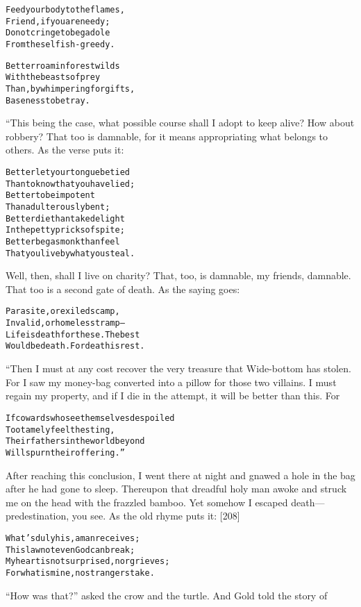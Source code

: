 \documentclass{article}
\renewenvironment{verbatim}{\begin{alltt}\normalfont\begin{centering}}{\end{centering}\end{alltt}}
\begin{document}
\begin{verbatim}
Feed your body to the flames,
    Friend, if you are needy;
Do not cringe to beg a dole
    From the selfish-greedy.

Better roam in forest wilds
With the beasts of prey
Than, by whimpering for gifts,
Baseness to betray.
\end{verbatim}
“This being the case, what possible course shall I adopt to keep
alive? How about robbery? That too is damnable, for it means
appropriating what belongs to others. As the verse puts it:

\begin{verbatim}
Better let your tongue be tied
Than to know that you have lied;
Better to be impotent
Than adulterously bent;
Better die than take delight
In the petty pricks of spite;
Better beg as monk than feel
That you live by what you steal.
\end{verbatim}
Well, then, shall I live on charity? That, too, is damnable, my
friends, damnable. That too is a second gate of death. As the
saying goes:

\begin{verbatim}
Parasite, or exiled scamp,
Invalid, or homeless tramp--
Life is death for these. The best
Would be death. For death is rest.
\end{verbatim}
“Then I must at any cost recover the very treasure that Wide-bottom
has stolen. For I saw my money-bag converted into a pillow for
those two villains. I must regain my property, and if I die in the
attempt, it will be better than this. For

\begin{verbatim}
If cowards who see themselves despoiled
    Too tamely feel the sting,
Their fathers in the world beyond
    Will spurn their offering.”
\end{verbatim}
After reaching this conclusion, I went there at night and gnawed a
hole in the bag after he had gone to sleep. Thereupon that dreadful
holy man awoke and struck me on the head with the frazzled bamboo.
Yet somehow I escaped death---predestination, you see. As the old
rhyme puts it: [208]

\begin{verbatim}
What's duly his, a man receives;
    This law not even God can break;
My heart is not surprised, nor grieves;
    For what is mine, no strangers take.
\end{verbatim}
``How was that?'' asked the crow and the turtle. And Gold told the
story of
\end{document}
